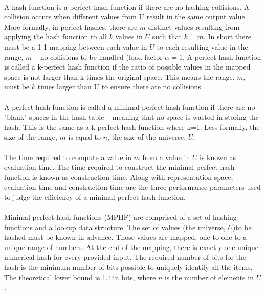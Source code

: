 			\paragraph{} A hash function is a perfect hash function if there are no hashing collisions. A collision occurs when different values from U result in the same output value. More formally, in perfect hashes, there are $m$ distinct values resulting from applying the hash function to all $k$ values in $U$ such that $k=m$.  In short there must be a 1-1 mapping between each value in $U$ to each resulting value in the range, $m$ -- no collisions to be handled (load factor $\alpha = 1$.  A perfect hash function is called a k-perfect hash function if the ratio of possible values in the mapped space is not larger than k times the original space.  This means the range, $m$, must be $k$ times larger than U to ensure there are no collisions.
			\paragraph{} A perfect hash function is called a minimal perfect hash function if there are no "blank" spaces in the hash table -- meaning that no space is wasted in storing the hash.  This is the same as a k-perfect hash function where k=1. Less formally, the size of the range, $m$ is equal to $n$, the size of the universe, $U$.
			\paragraph{}The time required to compute a value in $m$ from a value in $U$ is known as evaluation time.  The time required to construct the minimal perfect hash function is known as construction time.  Along with representation space, evaluation time and construction time are the three performance parameters used to judge the efficiency of a minimal perfect hash function.
			\paragraph{} Minimal perfect hash functions (MPHF) are comprised of a set of hashing functions and a lookup data structure.  The set of values (the universe, $U$)to be hashed must be known in advance.  Those values are mapped, one-to-one to a unique range of numbers.  At the end of the mapping, there is exactly one unique numerical hash for every provided input.  The required number of bits for the hash is the minimum number of bits possible to uniquely identify all the items. The theoretical lower bound is 1.44n bits, where $n$ is the number of elements in $U$. 
